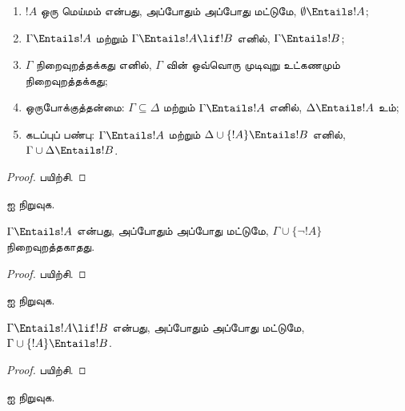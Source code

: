 \documentclass[../../../include/open-logic-section]{subfiles}
\begin{document}
\begin{prop}
\begin{enumerate}
\item $!A$ ஒரு மெய்மம் என்பது, அப்போதும் அப்போது மட்டுமே,
  $\emptyset \Entails !A$;
\item $\Gamma \Entails !A$ மற்றும் $\Gamma \Entails !A \lif !B$ எனில்,
  $\Gamma \Entails !B$;
\item $\Gamma$ நிறைவுறத்தக்கது எனில், $\Gamma$ வின் ஒவ்வொரு முடிவுறு
  உட்கணமும் நிறைவுறத்தக்கது;
\item {} ஒருபோக்குத்தன்மை: $\Gamma \subseteq \Delta$
  மற்றும் $\Gamma \Entails !A$ எனில், $\Delta \Entails !A$ உம்;
\item {} கடப்புப் பண்பு: $\Gamma \Entails !A$ மற்றும்
  $\Delta \cup \{ !A\} \Entails !B$ எனில், $\Gamma \cup \Delta \Entails
  !B$.
\end{enumerate}
\end{prop}

\begin{proof}
பயிற்சி.
\end{proof}

\begin{prob}
 ஐ நிறுவுக.
\end{prob}

\begin{prop}
  $\Gamma \Entails !A$ என்பது, அப்போதும் அப்போது மட்டுமே,
  $\Gamma \cup \{\lnot !A\}$ நிறைவுறத்தகாதது.
\end{prop}

\begin{proof}
பயிற்சி.
\end{proof}

\begin{prob}
 ஐ நிறுவுக.
\end{prob}

\begin{thm}[பொருண்மைக் கழித்தல் தேற்றம்]
   $\Gamma \Entails !A \lif !B$ என்பது,
  அப்போதும் அப்போது மட்டுமே, $\Gamma \cup \{!A\} \Entails !B$.
\end{thm}

\begin{proof}
பயிற்சி.
\end{proof}

\begin{prob}
 ஐ நிறுவுக.
\end{prob}
\end{document}
